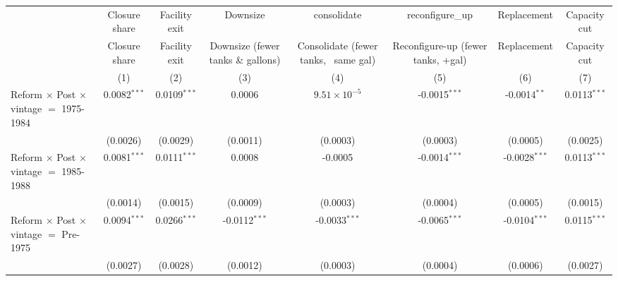
\begingroup
\centering
\begin{tabular}{lccccccc}
   \toprule
                                                         & Closure share  & Facility exit  & Downsize                           & consolidate                          & reconfigure\_up                    & Replacement     & Capacity cut\\  
                                                         & Closure share  & Facility exit  & Downsize (fewer tanks \& gallons)  & Consolidate (fewer tanks, ~same gal) & Reconfigure-up (fewer tanks, +gal) & Replacement     & Capacity cut \\   
                                                         & (1)            & (2)            & (3)                                & (4)                                  & (5)                                & (6)             & (7)\\  
   \midrule 
   Reform $\times$ Post $\times$ vintage $=$ 1975-1984   & 0.0082$^{***}$ & 0.0109$^{***}$ & 0.0006                             & $9.51\times 10^{-5}$                 & -0.0015$^{***}$                    & -0.0014$^{**}$  & 0.0113$^{***}$\\   
                                                         & (0.0026)       & (0.0029)       & (0.0011)                           & (0.0003)                             & (0.0003)                           & (0.0005)        & (0.0025)\\   
   Reform $\times$ Post $\times$ vintage $=$ 1985-1988   & 0.0081$^{***}$ & 0.0111$^{***}$ & 0.0008                             & -0.0005                              & -0.0014$^{***}$                    & -0.0028$^{***}$ & 0.0113$^{***}$\\   
                                                         & (0.0014)       & (0.0015)       & (0.0009)                           & (0.0003)                             & (0.0004)                           & (0.0005)        & (0.0015)\\   
   Reform $\times$ Post $\times$ vintage $=$ Pre-1975    & 0.0094$^{***}$ & 0.0266$^{***}$ & -0.0112$^{***}$                    & -0.0033$^{***}$                      & -0.0065$^{***}$                    & -0.0104$^{***}$ & 0.0115$^{***}$\\   
                                                         & (0.0027)       & (0.0028)       & (0.0012)                           & (0.0003)                             & (0.0004)                           & (0.0006)        & (0.0027)\\   

\end{tabular}
